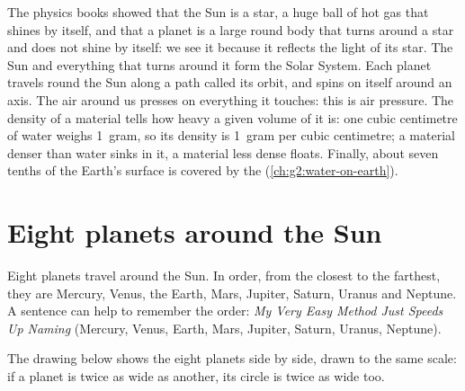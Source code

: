 \begin{recall}
The physics books showed that the Sun is a star, a huge ball of hot gas
that shines by itself, and that a planet is a large round body that turns
around a star and does not shine by itself: we see it because it reflects
the light of its star. The Sun and everything that turns around it form
the Solar System. Each planet travels round the Sun along a path called
its orbit, and spins on itself around an axis. The air around us presses
on everything it touches: this is air pressure. The density of a material
tells how heavy a given volume of it is: one cubic centimetre of water
weighs 1~gram, so its density is 1~gram per cubic centimetre; a material
denser than water sinks in it, a material less dense floats. Finally, about seven tenths of
the Earth's surface is covered by the 
(\cref{ch:g2:water-on-earth}).
\end{recall}

\section{Eight planets around the Sun}

Eight planets travel around the Sun. In order, from the closest to the
farthest, they are Mercury, Venus, the Earth, Mars, Jupiter, Saturn,
Uranus and Neptune. A sentence can help to remember the order: \emph{My
Very Easy Method Just Speeds Up Naming} (Mercury, Venus, Earth, Mars,
Jupiter, Saturn, Uranus, Neptune).

The drawing below shows the eight planets side by side, drawn to the same
scale: if a planet is twice as wide as another, its circle is twice as
wide too.

